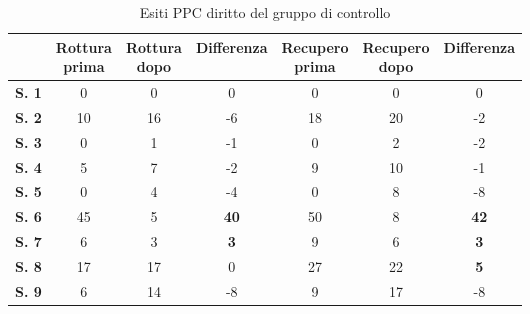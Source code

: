 \begin{table}[H]
\begin{center}
\begin{tabular}{|c|c|c|c|c|c|c|} \hline
{\textbf{}} & \pbox{20cm}{\textbf{Rottura} \\ \textbf{prima}} & \pbox{20cm}{\textbf{Rottura} \\ \textbf{dopo}} & \textbf{Differenza} & \pbox{20cm}{\textbf{Recupero} \\ \textbf{prima}} & \pbox{20cm}{\textbf{Recupero} \\ \textbf{dopo}} & \textbf{Differenza} \\ \hline
\textbf{S. 1} & 0 & 0 & 0 & 0 & 0 & 0 \\ \hline
\textbf{S. 2} & 10 & 16 & -6 & 18 & 20 & -2 \\ \hline
\textbf{S. 3} & 0 & 1 & -1 & 0 & 2 & -2 \\ \hline
\textbf{S. 4} & 5 & 7 & -2 & 9 & 10 & -1 \\ \hline
\textbf{S. 5} & 0 & 4 & -4 & 0 & 8 & -8 \\ \hline
\textbf{S. 6} & 45 & 5 & \textbf{40} & 50 & 8 & \textbf{42}  \\ \hline
\textbf{S. 7} & 6 & 3 & \textbf{3} & 9 & 6 & \textbf{3} \\ \hline
\textbf{S. 8} & 17 & 17 & 0 & 27 & 22 & \textbf{5} \\ \hline
\textbf{S. 9} & 6 & 14 & -8 & 9 & 17 & -8 \\ \hline
\end{tabular}
\end{center}
\caption{Esiti PPC diritto del gruppo di controllo}
\end{table}

\\\ \\\  


